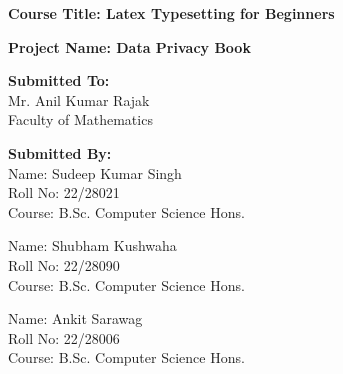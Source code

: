 \begin{titlepage}
    \vspace{2cm}

    {\Large \textbf{Course Title: Latex Typesetting for Beginners}} \\
    \vspace{0.5cm}
    
    {\Large \textbf{Project Name: Data Privacy Book}} \\
    \vspace{1.5cm}

    \begin{flushleft}
        {\large \textbf{Submitted To:}} \\
        \vspace{0.2cm}
        Mr. Anil Kumar Rajak \\
        Faculty of Mathematics \\
        \vspace{1cm}

        {\large \textbf{Submitted By:}} \\
        \vspace{1cm}
        Name: Sudeep Kumar Singh \\
        Roll No: 22/28021 \\
        Course: B.Sc. Computer Science Hons. \\
        \vspace{1cm}

        Name: Shubham Kushwaha \\
        Roll No: 22/28090 \\
        Course: B.Sc. Computer Science Hons. \\
        \vspace{1cm}

        Name: Ankit Sarawag \\
        Roll No: 22/28006 \\
        Course: B.Sc. Computer Science Hons.
    \end{flushleft}

    \vspace{1cm}
\end{titlepage}
